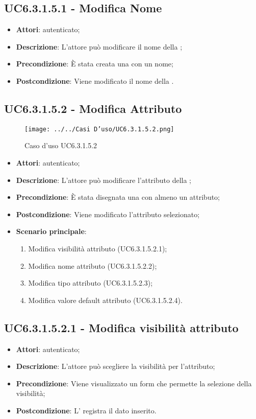\subsection{UC6.3.1.5.1 - Modifica Nome}
\label{ssec:UC6.3.1.5.1}
\begin{itemize}
\item \textbf{Attori}:  autenticato;
\item \textbf{Descrizione}: L'attore può modificare il nome della ;
\item \textbf{Precondizione}: È stata creata una  con un nome;
\item \textbf{Postcondizione}: Viene modificato il nome della .
\end{itemize}
\subsection{UC6.3.1.5.2 - Modifica Attributo}
\label{ssec:UC6.3.1.5.2}
\begin{figure}[h!]
\centering
\texttt{[image: ../../Casi D'uso/UC6.3.1.5.2.png]}
\caption{Caso d'uso UC6.3.1.5.2}
 \end{figure}
\begin{itemize}
\item \textbf{Attori}:  autenticato;
\item \textbf{Descrizione}: L'attore può modificare l'attributo della ;
\item \textbf{Precondizione}: È stata disegnata una  con almeno un attributo;
\item \textbf{Postcondizione}: Viene modificato l'attributo selezionato;
\item \textbf{Scenario principale}: \begin{enumerate}\item Modifica visibilità attributo (UC6.3.1.5.2.1);\item Modifica nome attributo (UC6.3.1.5.2.2);\item Modifica tipo attributo (UC6.3.1.5.2.3);\item Modifica valore default attributo (UC6.3.1.5.2.4).
 \end{enumerate}
\end{itemize}
\subsection{UC6.3.1.5.2.1 - Modifica visibilità attributo}
\label{ssec:UC6.3.1.5.2.1}
\begin{itemize}
\item \textbf{Attori}:  autenticato;
\item \textbf{Descrizione}: L'attore può scegliere la visibilità per l'attributo;
\item \textbf{Precondizione}: Viene visualizzato un form che permette la selezione della visibilità;
\item \textbf{Postcondizione}: L' registra il dato inserito.
\end{itemize}
